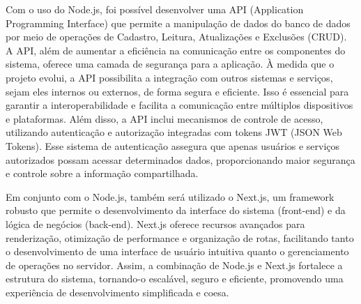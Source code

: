 Com o uso do Node.js, foi possível desenvolver uma API (Application Programming Interface) que permite a manipulação de dados do banco de dados por meio de operações de Cadastro, Leitura, Atualizações e Exclusões (CRUD). A API, além de aumentar a eficiência na comunicação entre os componentes do sistema, oferece uma camada de segurança para a aplicação. À medida que o projeto evolui, a API possibilita a integração com outros sistemas e serviços, sejam eles internos ou externos, de forma segura e eficiente. Isso é essencial para garantir a interoperabilidade e facilita a comunicação entre múltiplos dispositivos e plataformas. Além disso, a API inclui mecanismos de controle de acesso, utilizando autenticação e autorização integradas com tokens JWT (JSON Web Tokens). Esse sistema de autenticação assegura que apenas usuários e serviços autorizados possam acessar determinados dados, proporcionando maior segurança e controle sobre a informação compartilhada.

Em conjunto com o Node.js, também será utilizado o Next.js, um framework robusto que permite o desenvolvimento da interface do sistema (front-end) e da lógica de negócios (back-end). Next.js oferece recursos avançados para renderização, otimização de performance e organização de rotas, facilitando tanto o desenvolvimento de uma interface de usuário intuitiva quanto o gerenciamento de operações no servidor. Assim, a combinação de Node.js e Next.js fortalece a estrutura do sistema, tornando-o escalável, seguro e eficiente, promovendo uma experiência de desenvolvimento simplificada e coesa.






